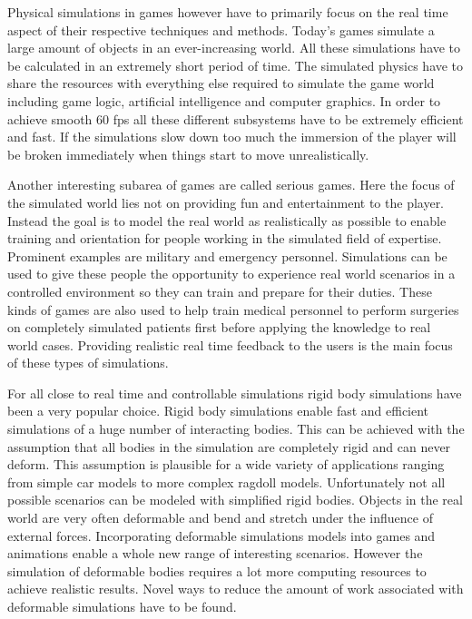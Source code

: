 Physical simulations in games however have to primarily focus on the real time aspect of their respective techniques and methods. Today's games simulate a large amount of objects in an ever-increasing world. All these simulations have to be calculated in an extremely short period of time. The simulated physics have to share the resources with everything else required to simulate the game world including game logic, artificial intelligence and computer graphics. In order to achieve smooth 60 fps all these different subsystems have to be extremely efficient and fast. If the simulations slow down too much the immersion of the player will be broken immediately when things start to move unrealistically.

Another interesting subarea of games are called serious games. Here the focus of the simulated world lies not on providing fun and entertainment to the player. Instead the goal is to model the real world as realistically as possible to enable training and orientation for people working in the simulated field of expertise. Prominent examples are military and emergency personnel. Simulations can be used to give these people the opportunity to experience real world scenarios in a controlled environment so they can train and prepare for their duties. These kinds of games are also used to help train medical personnel to perform surgeries on completely simulated patients first before applying the knowledge to real world cases. Providing realistic real time feedback to the users is the main focus of these types of simulations.

For all close to real time and controllable simulations rigid body simulations have been a very popular choice. Rigid body simulations enable fast and efficient simulations of a huge number of interacting bodies. This can be achieved with the assumption that all bodies in the simulation are completely rigid and can never deform. This assumption is plausible for a wide variety of applications ranging from simple car models to more complex ragdoll models. Unfortunately not all possible scenarios can be modeled with simplified rigid bodies. Objects in the real world are very often deformable and bend and stretch under the influence of external forces. Incorporating deformable simulations models into games and animations enable a whole new range of interesting scenarios. However the simulation of deformable bodies requires a lot more computing resources to achieve realistic results. Novel ways to reduce the amount of work associated with deformable simulations have to be found.


